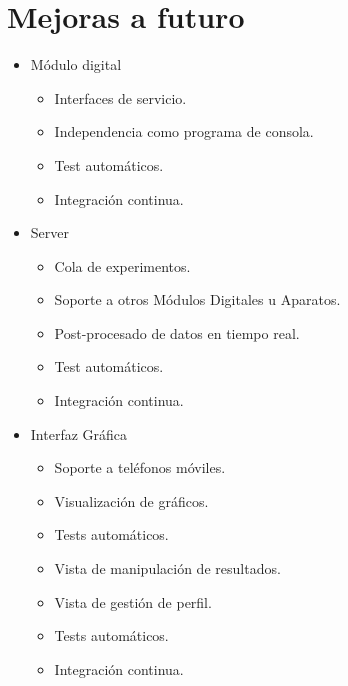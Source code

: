 \section{Mejoras a futuro}

\begin{itemize}

\item M\'odulo digital
    \begin{itemize}
    \item Interfaces de servicio.
    \item Independencia como programa de consola.
    \item Test autom\'aticos.
    \item Integraci\'on continua.
    \end{itemize}
\item Server
    \begin{itemize}
    \item Cola de experimentos.
    \item Soporte a otros M\'odulos Digitales u Aparatos.
    \item Post-procesado de datos en tiempo real.
    \item Test autom\'aticos.
    \item Integraci\'on continua.
    \end{itemize}
\item Interfaz Gr\'afica
    \begin{itemize}
    \item Soporte a tel\'efonos m\'oviles.
    \item Visualizaci\'on de gr\'aficos.
    \item Tests autom\'aticos.
    \item Vista de manipulaci\'on de resultados.
    \item Vista de gesti\'on de perfil.
    \item Tests autom\'aticos.
    \item Integraci\'on continua.
    \end{itemize}
\end{itemize}
\newpage